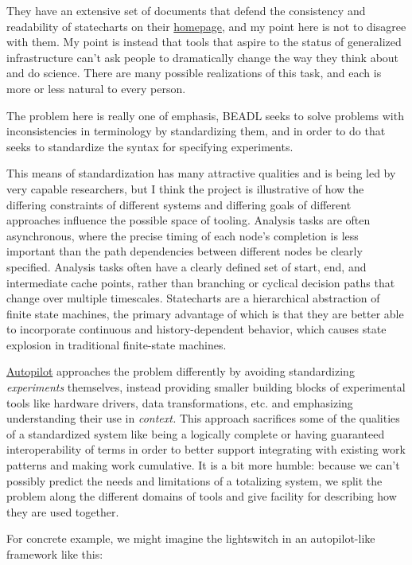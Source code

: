 \documentclass[notoc]{tufte-book}
\begin{document}
They have an extensive set of documents that defend the consistency and
readability of statecharts on their
\href{https://statecharts.dev/}{homepage}, and my point here is not to
disagree with them. My point is instead that tools that aspire to the
status of generalized infrastructure can't ask people to dramatically
change the way they think about and do science. There are many possible
realizations of this task, and each is more or less natural to every
person.

The problem here is really one of emphasis, BEADL seeks to solve
problems with inconsistencies in terminology by standardizing them, and
in order to do that seeks to standardize the syntax for specifying
experiments.

This means of standardization has many attractive qualities and is being
led by very capable researchers, but I think the project is illustrative
of how the differing constraints of different systems and differing
goals of different approaches influence the possible space of tooling.
Analysis tasks are often asynchronous, where the precise timing of each
node's completion is less important than the path dependencies between
different nodes be clearly specified. Analysis tasks often have a
clearly defined set of start, end, and intermediate cache points, rather
than branching or cyclical decision paths that change over multiple
timescales. Statecharts are a hierarchical abstraction of finite state
machines, the primary advantage of which is that they are better able to
incorporate continuous and history-dependent behavior, which causes
state explosion in traditional finite-state machines.

\href{https://docs.auto-pi-lot.com}{Autopilot} \citep{saundersAutopilotAutomatingBehavioral2019}  approaches the problem
differently by avoiding standardizing \emph{experiments} themselves,
instead providing smaller building blocks of experimental tools like
hardware drivers, data transformations, etc. and emphasizing
understanding their use in \emph{context.} This approach sacrifices some
of the qualities of a standardized system like being a logically
complete or having guaranteed interoperability of terms in order to
better support integrating with existing work patterns and making work
cumulative. It is a bit more humble: because we can't possibly predict
the needs and limitations of a totalizing system, we split the problem
along the different domains of tools and give facility for describing
how they are used together.

For concrete example, we might imagine the lightswitch in an
autopilot-like framework like this:
\end{document}
